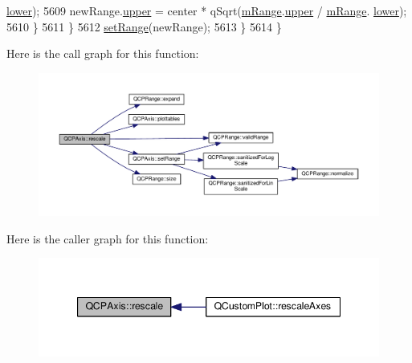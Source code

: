 \begin{DoxyCode}
      \hyperlink{class_q_c_p_range_aa3aca3edb14f7ca0c85d912647b91745}{lower});
5609         newRange.\hyperlink{class_q_c_p_range_ae44eb3aafe1d0e2ed34b499b6d2e074f}{upper} = center * qSqrt(\hyperlink{class_q_c_p_axis_a1ee36773c49062d751560e11f90845f7}{mRange}.\hyperlink{class_q_c_p_range_ae44eb3aafe1d0e2ed34b499b6d2e074f}{upper} / \hyperlink{class_q_c_p_axis_a1ee36773c49062d751560e11f90845f7}{mRange}.
      \hyperlink{class_q_c_p_range_aa3aca3edb14f7ca0c85d912647b91745}{lower});
5610       \}
5611     \}
5612     \hyperlink{class_q_c_p_axis_aebdfea5d44c3a0ad2b4700cd4d25b641}{setRange}(newRange);
5613   \}
5614 \}
\end{DoxyCode}


Here is the call graph for this function\+:\nopagebreak
\begin{figure}[H]
\begin{center}
\leavevmode
\includegraphics[width=350pt]{class_q_c_p_axis_a499345f02ebce4b23d8ccec96e58daa9_cgraph}
\end{center}
\end{figure}




Here is the caller graph for this function\+:\nopagebreak
\begin{figure}[H]
\begin{center}
\leavevmode
\includegraphics[width=347pt]{class_q_c_p_axis_a499345f02ebce4b23d8ccec96e58daa9_icgraph}
\end{center}
\end{figure}


\hypertarget{class_q_c_p_axis_ac937d2a602f865aff2ab6c1e288739f6}{}
